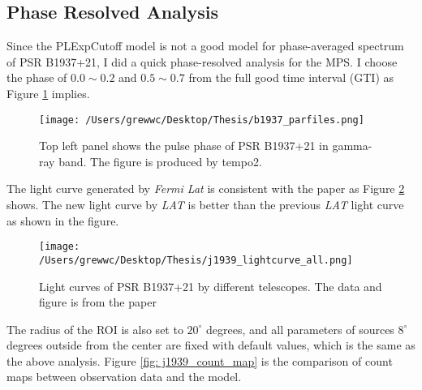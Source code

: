 \documentclass[12pt]{report}
\begin{document}


          \subsection{Phase Resolved Analysis}
            Since the PLExpCutoff model is not a good model for phase-averaged spectrum of 
            PSR B1937+21, I did a quick phase-resolved analysis for the MPS. I choose the 
            phase of $0.0 \sim 0.2$ and $0.5 \sim 0.7$ from the full good time interval (GTI) as 
            Figure \ref{fig: j1939_phase} implies. 
            \begin{figure}[!htp]
              \centering 
              \texttt{[image: /Users/grewwc/Desktop/Thesis/b1937\_parfiles.png]}
              \caption{Top left panel shows the pulse phase of PSR B1937+21 in gamma-ray band. 
                The figure is produced by tempo2.}
              \label{fig: j1939_phase}
            \end{figure}

            The light curve generated by \textit{Fermi Lat} is consistent with the paper 
            \cite{J1939_old} as Figure \ref{fig: j1939_light_curve_compare} shows. 
            The new light curve by \textit{LAT} is better than the previous \textit{LAT} light curve
            as shown in the figure. 

            \begin{figure}
              \centering 
              \texttt{[image: /Users/grewwc/Desktop/Thesis/j1939\_lightcurve\_all.png]}
              \caption{Light curves of PSR B1937+21 by different telescopes. The data and figure
                is from the paper \cite{J1939_old}}
              \label{fig: j1939_light_curve_compare}
            \end{figure}


            The radius of the ROI is also set to $20^{\circ}$ degrees, and all parameters of 
            sources $8^{\circ}$ degrees outside from the center are fixed with default values, 
            which is the same as the above analysis. 
            Figure \ref{fig: j1939_count_map} is the comparison of count maps between 
            observation data and the model.
\end{document}
